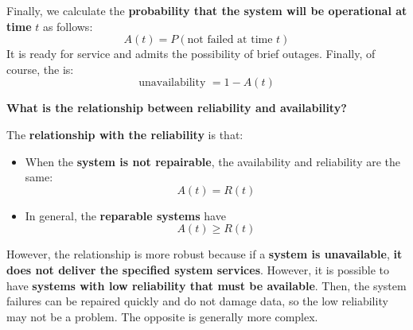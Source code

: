 \highspace
Finally, we calculate the \textbf{probability that the system will be operational at time} $t$ as follows:
\begin{equation}
    A\left(t\right) = P\left(\text{not failed at time } t\right)
\end{equation}
It is ready for service and admits the possibility of brief outages. Finally, of course, the  is:
\begin{equation}
    \text{unavailability } = 1-A\left(t\right)
\end{equation}

\highspace
\begin{flushleft}
    \textcolor{Green3}{ \textbf{What is the relationship between reliability and availability?}}
\end{flushleft}
The \textbf{relationship with the reliability} is that:
\begin{itemize}
    \item When the \textbf{system is not repairable}, the availability and reliability are the same:
    \begin{equation}
        A\left(t\right) = R\left(t\right)
    \end{equation}

    \item In general, the \textbf{reparable systems} have
    \begin{equation}
        A\left(t\right) \ge R\left(t\right)
    \end{equation}
\end{itemize}
However, the relationship is more robust because if a \textbf{system is unavailable}, \textbf{it does not deliver the specified system services}. However, it is possible to have \textbf{systems with low reliability that must be available}. Then, the system failures can be repaired quickly and do not damage data, so the low reliability may not be a problem. The opposite is generally more complex.

\newpage

